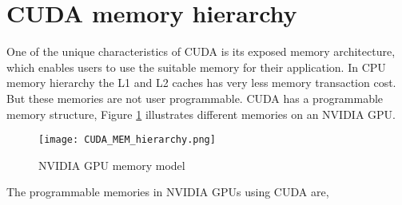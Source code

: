 \section{CUDA memory hierarchy}
One of the unique characteristics of CUDA is its exposed memory architecture, which enables users to use the suitable memory for their application. In CPU memory hierarchy the L1 and L2 caches has very less memory transaction cost. But these memories are not user programmable. CUDA has a programmable memory structure, Figure \ref{Figure:2.2} illustrates different memories on an NVIDIA GPU.
\begin{figure}[h!]
  \centering
  \texttt{[image: CUDA\_MEM\_hierarchy.png]}
  \caption{NVIDIA GPU memory model \cite{ProfessionalCUDA}}
  \label{Figure:2.2}
\end{figure}
The programmable memories in NVIDIA GPUs using CUDA are\cite{ProfessionalCUDA},
